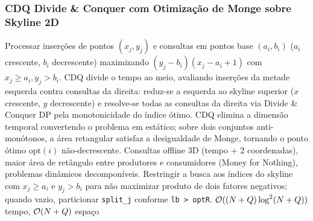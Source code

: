 \subsubsection{CDQ Divide \& Conquer com Otimização de Monge sobre Skyline 2D}
\algobox
  {Processar inserções de pontos $(x_j, y_j)$ e consultas em pontos base $(a_i, b_i)$ ($a_i$ crescente, $b_i$ decrescente) maximizando $(y_j - b_i)(x_j - a_i + 1)$ com $x_j \ge a_i, y_j > b_i$.}
  {CDQ divide o tempo ao meio, avaliando inserções da metade esquerda contra consultas da direita: reduz-se a esquerda ao skyline superior ($x$ crescente, $y$ decrescente) e resolve-se todas as consultas da direita via Divide \& Conquer DP pela monotonicidade do índice ótimo.}
  {CDQ elimina a dimensão temporal convertendo o problema em estático; sobre dois conjuntos anti-monótonos, a área retangular satisfaz a desigualdade de Monge, tornando o ponto ótimo $\text{opt}(i)$ não-decrescente.}
  {Consultas offline 3D (tempo + 2 coordenadas), maior área de retângulo entre produtores e consumidores (Money for Nothing), problemas dinâmicos decomponíveis.}
  {Restringir a busca aos índices do skyline com $x_j \ge a_i$ e $y_j > b_i$ para não maximizar produto de dois fatores negativos; quando vazio, particionar \texttt{split\_j} conforme \texttt{lb > optR}.}
  {$\mathcal{O}((N + Q) \log^2(N + Q))$ tempo, $\mathcal{O}(N + Q)$ espaço}

